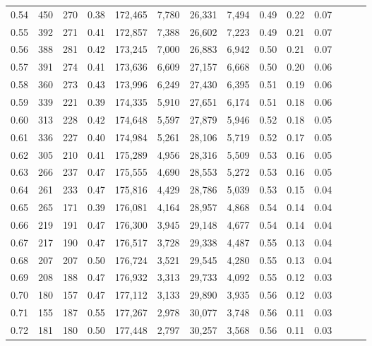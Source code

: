 \begin{tabular}{rrrrrrrrrrrrrr}
0.54 &    450 &  270 &  0.38 &  172,465 &    7,780 &  26,331 &   7,494 &  0.49 &  0.22 &      0.07 \\
0.55 &    392 &  271 &  0.41 &  172,857 &    7,388 &  26,602 &   7,223 &  0.49 &  0.21 &      0.07 \\
0.56 &    388 &  281 &  0.42 &  173,245 &    7,000 &  26,883 &   6,942 &  0.50 &  0.21 &      0.07 \\
0.57 &    391 &  274 &  0.41 &  173,636 &    6,609 &  27,157 &   6,668 &  0.50 &  0.20 &      0.06 \\
0.58 &    360 &  273 &  0.43 &  173,996 &    6,249 &  27,430 &   6,395 &  0.51 &  0.19 &      0.06 \\
0.59 &    339 &  221 &  0.39 &  174,335 &    5,910 &  27,651 &   6,174 &  0.51 &  0.18 &      0.06 \\
0.60 &    313 &  228 &  0.42 &  174,648 &    5,597 &  27,879 &   5,946 &  0.52 &  0.18 &      0.05 \\
0.61 &    336 &  227 &  0.40 &  174,984 &    5,261 &  28,106 &   5,719 &  0.52 &  0.17 &      0.05 \\
0.62 &    305 &  210 &  0.41 &  175,289 &    4,956 &  28,316 &   5,509 &  0.53 &  0.16 &      0.05 \\
0.63 &    266 &  237 &  0.47 &  175,555 &    4,690 &  28,553 &   5,272 &  0.53 &  0.16 &      0.05 \\
0.64 &    261 &  233 &  0.47 &  175,816 &    4,429 &  28,786 &   5,039 &  0.53 &  0.15 &      0.04 \\
0.65 &    265 &  171 &  0.39 &  176,081 &    4,164 &  28,957 &   4,868 &  0.54 &  0.14 &      0.04 \\
0.66 &    219 &  191 &  0.47 &  176,300 &    3,945 &  29,148 &   4,677 &  0.54 &  0.14 &      0.04 \\
0.67 &    217 &  190 &  0.47 &  176,517 &    3,728 &  29,338 &   4,487 &  0.55 &  0.13 &      0.04 \\
0.68 &    207 &  207 &  0.50 &  176,724 &    3,521 &  29,545 &   4,280 &  0.55 &  0.13 &      0.04 \\
0.69 &    208 &  188 &  0.47 &  176,932 &    3,313 &  29,733 &   4,092 &  0.55 &  0.12 &      0.03 \\
0.70 &    180 &  157 &  0.47 &  177,112 &    3,133 &  29,890 &   3,935 &  0.56 &  0.12 &      0.03 \\
0.71 &    155 &  187 &  0.55 &  177,267 &    2,978 &  30,077 &   3,748 &  0.56 &  0.11 &      0.03 \\
0.72 &    181 &  180 &  0.50 &  177,448 &    2,797 &  30,257 &   3,568 &  0.56 &  0.11 &      0.03 \\

\end{tabular}
